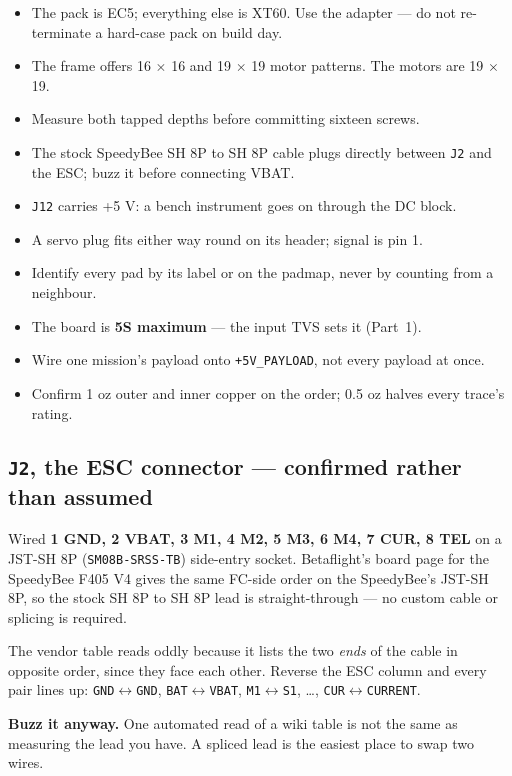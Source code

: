 \documentclass[11pt,a4paper]{article}
\newcommand{\file}[1]{\texttt{\small #1}}
\begin{document}
\begin{itemize}
\item The pack is EC5; everything else is XT60. Use the adapter --- do not re-terminate a
hard-case pack on build day.
\item The frame offers 16 $\times$ 16 and 19 $\times$ 19 motor patterns. The motors are 19 $\times$ 19.
\item Measure both tapped depths before committing sixteen screws.
\item The stock SpeedyBee SH 8P to SH 8P cable plugs directly between \file{J2} and the ESC; buzz it before connecting VBAT.
\item \file{J12} carries +5 V: a bench instrument goes on through the DC block.
\item A servo plug fits either way round on its header; signal is pin 1.
\item Identify every pad by its label or on the padmap, never by counting from a neighbour.
\item The board is \textbf{5S maximum} --- the input TVS sets it (Part~1).
\item Wire one mission's payload onto \file{+5V\_PAYLOAD}, not every payload at once.
\item Confirm 1 oz outer and inner copper on the order; 0.5 oz halves every trace's rating.
\end{itemize}

\subsection{\file{J2}, the ESC connector --- confirmed rather than assumed}

Wired \textbf{1 GND, 2 VBAT, 3 M1, 4 M2, 5 M3, 6 M4, 7 CUR, 8 TEL} on a JST-SH 8P
(\file{SM08B-SRSS-TB}) side-entry socket. Betaflight's board page for the SpeedyBee F405 V4
gives the same FC-side order on the SpeedyBee's JST-SH 8P, so the stock SH 8P to SH 8P lead
is straight-through --- no custom cable or splicing is required.

The vendor table reads oddly because it lists the two \emph{ends} of the cable in opposite
order, since they face each other. Reverse the ESC column and every pair lines up:
\file{GND}$\leftrightarrow$\file{GND}, \file{BAT}$\leftrightarrow$\file{VBAT},
\file{M1}$\leftrightarrow$\file{S1}, \ldots, \file{CUR}$\leftrightarrow$\file{CURRENT}.

\textbf{Buzz it anyway.} One automated read of a wiki table is not the same as measuring
the lead you have. A spliced lead is the easiest place to swap two wires.
\end{document}
